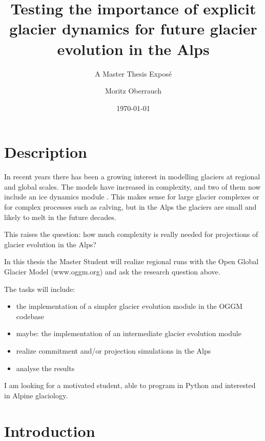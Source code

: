 \documentclass[12pt, a4paper, abstract=off, oneside]{scrartcl}
\begin{document}
	\title{Testing the importance of explicit glacier dynamics for future glacier evolution in the Alps}
    \subtitle{A Master Thesis Exposé}
	\author{Moritz Oberrauch}
	\date{\today}

    \thispagestyle{empty}
	\maketitle
    \pagebreak

    \section*{Description}
        In recent years there has been a growing interest in modelling glaciers at regional and global scales. The models have increased in complexity, and two of them now include an ice dynamics module \citep{Maussion2019, Huss2015}. This makes sense for large glacier complexes or for complex processes such as calving, but in the Alps the glaciers are small and likely to melt in the future decades.

        This raises the question: how much complexity is really needed for projections of glacier evolution in the Alps?

        In this thesis the Master Student will realize regional runs with the Open Global Glacier Model (www.oggm.org) and ask the research question above.

        The tasks will include:
        \begin{itemize}
            \item the implementation of a simpler glacier evolution module in the OGGM codebase \citep{Marzeion2012a}
            \item maybe: the implementation of an intermediate glacier evolution module \citep{Huss2015}
            \item realize commitment and/or projection simulations in the Alps
            \item analyse the results
        \end{itemize}

        I am looking for a motivated student, able to program in Python and interested in Alpine glaciology.

    \section{Introduction} %
    \label{sec:introduction}
\end{document}
